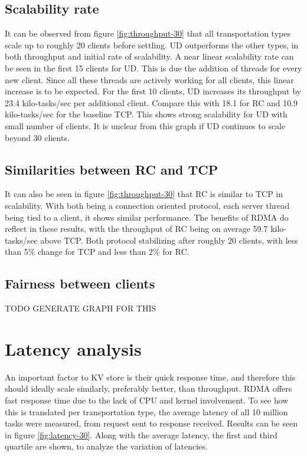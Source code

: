 \subsection{Scalability rate}\label{subsec:scalability-rate}
It can be observed from figure \ref{fig:throughput-30} that all transportation types scale up to roughly 20 clients before settling.
UD outperforms the other types, in both throughput and initial rate of scalability.
A near linear scalability rate can be seen in the first 15 clients for UD.
This is due the addition of threads for every new client.
Since all these threads are actively working for all clients, this linear increase is to be expected.
For the first 10 clients, UD increases its throughput by 23.4 kilo-tasks/sec per additional client.
Compare this with 18.1 for RC and 10.9 kilo-tasks/sec for the baseline TCP.
This shows strong scalability for UD with small number of clients.
It is unclear from this graph if UD continues to scale beyond 30 clients.

\subsection{Similarities between RC and TCP}
It can also be seen in figure \ref{fig:throughput-30} that RC is similar to TCP in scalability.
With both being a connection oriented protocol, each server thread being tied to a client, it shows similar performance.
The benefits of RDMA do reflect in these results, with the throughput of RC being on average 59.7 kilo-tasks/sec above TCP.
Both protocol stabilizing after roughly 20 clients, with less than 5\% change for TCP and less than 2\% for RC.

\subsection{Fairness between clients}
TODO GENERATE GRAPH FOR THIS

\section{Latency analysis}\label{sec:latency:analysis}
An important factor to KV store is their quick response time, and therefore this should ideally scale similarly, preferably better, than throughput.
RDMA offers fast response time due to the lack of CPU and kernel involvement.
To see how this is translated per transportation type, the average latency of all 10 million tasks were measured, from request sent to response received.
Results can be seen in figure \ref{fig:latency-30}.
Along with the average latency, the first and third quartile are shown, to analyze the variation of latencies.


